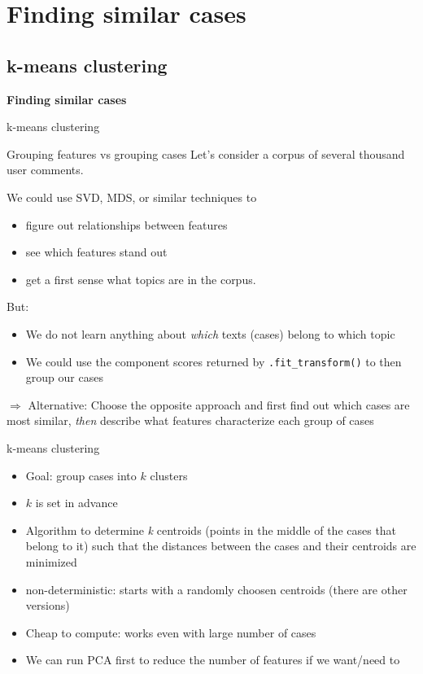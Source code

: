 \documentclass[compress]{beamer}
\begin{document}
\section{Finding similar cases}

\subsection{k-means clustering}

\begin{frame}[plain]
\textbf{Finding similar cases}

k-means clustering
\end{frame}




\begin{frame}{Grouping features vs grouping cases}
Let's consider a corpus of several thousand user comments.

We could use SVD, MDS, or similar techniques to 
\begin{itemize}
\item figure out relationships between features
\item see which features stand out
\item get a first sense what topics are in the corpus.
\end{itemize}
\pause

But:
\begin{itemize}
\item<+-> We do not learn anything about \emph{which} texts (cases) belong to which topic
\item<+-> We could use the component scores returned by \texttt{.fit\_transform()} to then group our cases
\end{itemize}

\pause 
$\Rightarrow$ \footnotesize{Alternative: Choose the opposite approach and first find out which cases are most similar, \textit{then} describe what features characterize each group of cases}


\end{frame}




\begin{frame}{k-means clustering}
\begin{itemize}[<+->]
\item Goal: group cases into $k$ clusters
\item $k$ is set in advance
\item Algorithm to determine \textit{k} centroids (points in the middle of the cases that belong to it) such that the distances between the cases and their centroids are minimized
\item non-deterministic: starts with a randomly choosen centroids (there are other versions)
\item Cheap to compute: works even with large number of cases
\item We can run PCA first to reduce the number of features if we want/need to
\end{itemize}
\end{frame}
\end{document}
